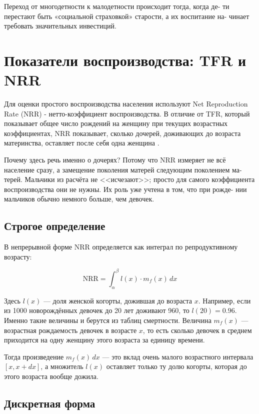 \documentclass[a4paper, 14pt]{extarticle}
\begin{document}
Переход от многодетности к малодетности происходит тогда, когда де-
ти перестают быть «социальной страховкой» старости, а их воспитание на-
чинает требовать значительных инвестиций.

\section{Показатели воспроизводства: TFR и NRR}

Для оценки простого воспроизводства населения используют Net Reproduction Rate (NRR) - нетто-коэффициент воспроизводства. В отличие от TFR, который показывает общее число рождений на женщину при текущих возрастных коэффициентах, NRR показывает, сколько дочерей, доживающих до возраста материнства, оставляет после себя одна женщина \cite{undata_nrr}.

Почему здесь речь именно о дочерях? Потому что NRR измеряет не всё
население сразу, а замещение поколения матерей следующим поколением ма-
терей. Мальчики из расчёта не <<исчезают>>; просто для самого коэффициента
воспроизводства они не нужны. Их роль уже учтена в том, что при рожде-
нии мальчиков обычно немного больше, чем девочек.

\subsection{Строгое определение}

В непрерывной форме NRR определяется как интеграл по репродуктивному возрасту:

\begin{equation}
\text{NRR} = \int_{\alpha}^{\beta} l(x) \cdot m_f(x) \, dx
\label{eq:nrr_cont}
\end{equation}

Здесь $l(x)$ --- доля женской когорты, дожившая до возраста $x$. Например, если из 1000 новорождённых девочек до 20 лет доживают 960, то $l(20)=0.96$. Именно такие величины и берутся из таблиц смертности. Величина $m_f(x)$ --- возрастная рождаемость девочек в возрасте $x$, то есть сколько девочек в среднем приходится на одну женщину этого возраста за единицу времени.

Тогда произведение $m_f(x)\,dx$ --- это вклад очень малого возрастного интервала $[x,x+dx]$, а множитель $l(x)$ оставляет только ту долю когорты, которая до этого возраста вообще дожила.

\subsection{Дискретная форма}
\end{document}
